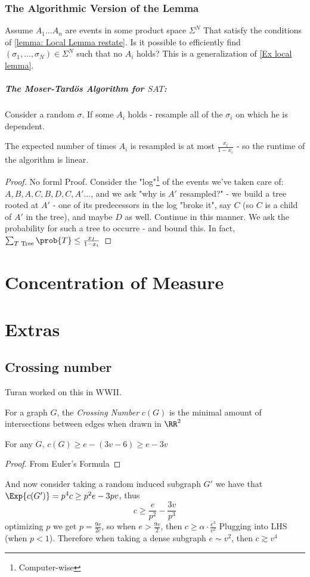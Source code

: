 \documentclass[a4paper, 11pt, oneside]{book}
\begin{document}
	\subsection{The Algorithmic Version of the Lemma}
	Assume $A_1\ldots A_n$ are events in some product space $\Sigma^N$ That satisfy the conditions of \autoref{lemma: Local Lemma restate}. Is it possible to efficiently find $(\sigma_1,\ldots ,\sigma_N)\in \Sigma^N$ such that no $A_i$ holds? This is a generalization of \autoref{Ex local lemma}.
	\paragraph{The Moser-Tard\"os Algorithm for $SAT$:} Consider a  random $\sigma$. If some $A_i$ holds - resample all of the $\sigma_i$ on which he is dependent.
	\begin{claim}
		The expected number of times $A_i$ is resampled is at most $\frac{x_i}{1-x_i}$ - so the runtime of the algorithm is linear.
	\end{claim}
	\begin{proof}
		No forml Proof. Consider the "log"\footnote{Computer-wise} of the events we've taken care of: $A,B,A,C,B,D,C,A'\dots$, and we ask "why is $A'$ resampled?" - we build a tree rooted at $A'$ - one of its predecessors in the log "broke it", say $C$ (so $C$ is a child of $A'$ in the tree), and maybe $D$ as well. Continue in this manner. We ask the probability for such a tree to occurre - and bound this. In fact, $\sum_{T\text{ Tree}}\prob{T} \le \frac{x_I}{1-x_i}$
	\end{proof}
	\chapter{Concentration of Measure}
\chapter{Extras}
\section{Crossing number}
Turan worked on this in WWII.

\begin{defn}
	 For a graph $G$, the \emph{Crossing Number} $c(G)$ is the minimal amount of intersections between edges when drawn in $\RR^2$
\end{defn}
\begin{claim}
	For any $G$, $c(G) \ge e-(3v-6) \ge e-3v$
\end{claim}
\begin{proof}
	From Euler's Formula
\end{proof}
And now consider taking a random induced subgraph $G'$ we have that $\Exp{c(G')} = p^4c\ge p^2e - 3pv$, thus
	\[
	c\ge \frac{e}{p^2}-\frac{3v}{p^3}
	\]
optimizing $p$ we get $p = \frac{9v}{2e}$, so when $e > \frac{9v}{2}$, then $c \ge \alpha\cdot \frac{e^3}{v^2}$ Plugging into LHS (when $p<1$). Therefore when taking a dense subgraph $e\sim v^2$, then $c\gtrsim v^4$
\end{document}
